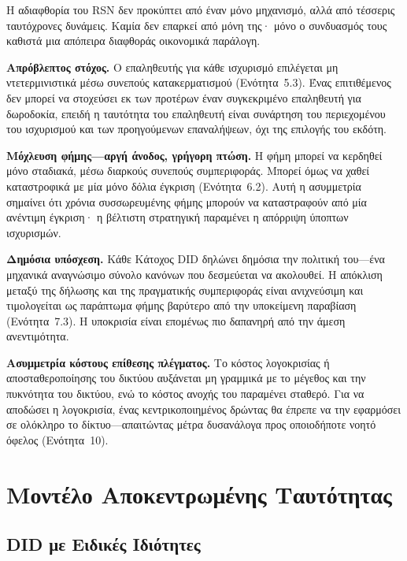 \documentclass[11pt,a4paper,twocolumn]{article}
\begin{document}
Η αδιαφθορία του RSN δεν προκύπτει από έναν μόνο μηχανισμό, αλλά από τέσσερις ταυτόχρονες δυνάμεις. Καμία δεν επαρκεί από μόνη της· μόνο ο συνδυασμός τους καθιστά μια απόπειρα διαφθοράς οικονομικά παράλογη.

\textbf{Απρόβλεπτος στόχος.} Ο επαληθευτής για κάθε ισχυρισμό επιλέγεται μη ντετερμινιστικά μέσω συνεπούς κατακερματισμού (Ενότητα~5.3). Ένας επιτιθέμενος δεν μπορεί να στοχεύσει εκ των προτέρων έναν συγκεκριμένο επαληθευτή για δωροδοκία, επειδή η ταυτότητα του επαληθευτή είναι συνάρτηση του περιεχομένου του ισχυρισμού και των προηγούμενων επαναλήψεων, όχι της επιλογής του εκδότη.

\textbf{Μόχλευση φήμης---αργή άνοδος, γρήγορη πτώση.} Η φήμη μπορεί να κερδηθεί μόνο σταδιακά, μέσω διαρκούς συνεπούς συμπεριφοράς. Μπορεί όμως να χαθεί καταστροφικά με μία μόνο δόλια έγκριση (Ενότητα~6.2). Αυτή η ασυμμετρία σημαίνει ότι χρόνια συσσωρευμένης φήμης μπορούν να καταστραφούν από μία ανέντιμη έγκριση· η βέλτιστη στρατηγική παραμένει η απόρριψη ύποπτων ισχυρισμών.

\textbf{Δημόσια υπόσχεση.} Κάθε Κάτοχος DID δηλώνει δημόσια την πολιτική του---ένα μηχανικά αναγνώσιμο σύνολο κανόνων που δεσμεύεται να ακολουθεί. Η απόκλιση μεταξύ της δήλωσης και της πραγματικής συμπεριφοράς είναι ανιχνεύσιμη και τιμολογείται ως παράπτωμα φήμης βαρύτερο από την υποκείμενη παραβίαση (Ενότητα~7.3). Η υποκρισία είναι επομένως πιο δαπανηρή από την άμεση ανεντιμότητα.

\textbf{Ασυμμετρία κόστους επίθεσης πλέγματος.} Το κόστος λογοκρισίας ή αποσταθεροποίησης του δικτύου αυξάνεται μη γραμμικά με το μέγεθος και την πυκνότητα του δικτύου, ενώ το κόστος ανοχής του παραμένει σταθερό. Για να αποδώσει η λογοκρισία, ένας κεντρικοποιημένος δρώντας θα έπρεπε να την εφαρμόσει σε ολόκληρο το δίκτυο---απαιτώντας μέτρα δυσανάλογα προς οποιοδήποτε νοητό όφελος (Ενότητα~10).

\section{Μοντέλο Αποκεντρωμένης Ταυτότητας}

\subsection{DID με Ειδικές Ιδιότητες}
\end{document}
